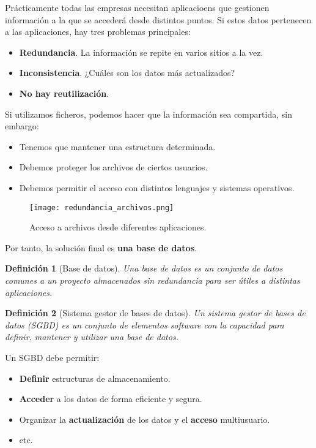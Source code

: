 \documentclass[12pt,spanish]{article}
\newtheorem{definition}{Definición}
\numberwithin{definition}{subsection}
\begin{document}
Prácticamente todas las empresas necesitan aplicacioens que gestionen información a la que se accederá desde distintos puntos. Si estos datos pertenecen a las aplicaciones, hay tres problemas principales:
\begin{itemize}
	\item \textbf{Redundancia}. La información se repite en varios sitios a la vez.
	\item \textbf{Inconsistencia}. ¿Cuáles son los datos más actualizados?
	\item \textbf{No hay reutilización}. 
\end{itemize}

Si utilizamos ficheros, podemos hacer que la información sea compartida, sin embargo:
\begin{itemize}
	\item Tenemos que mantener una estructura determinada.
	\item Debemos proteger los archivos de ciertos usuarios.
	\item Debemos permitir el acceso con distintos lenguajes y sistemas operativos.
\end{itemize}

\begin{figure}[H]
\centering
\texttt{[image: redundancia\_archivos.png]}
\caption{Acceso a archivos desde diferentes aplicaciones.}
\end{figure}

Por tanto, la solución final es \textbf{una base de datos}.

\begin{definition}[Base de datos]
Una \emph{base de datos} es un conjunto de datos comunes a un \textit{proyecto} almacenados sin redundancia para ser útiles a distintas aplicaciones.
\end{definition}

\begin{definition}[Sistema gestor de bases de datos]
Un \emph{sistema gestor de bases de datos (SGBD)} es un conjunto de elementos software con la capacidad para definir, mantener y utilizar una base de datos.
\end{definition}

Un SGBD debe permitir:
\begin{itemize}
\item \textbf{Definir} estructuras de almacenamiento.
\item \textbf{Acceder} a los datos de forma eficiente y segura.
\item Organizar la \textbf{actualización} de los datos y el \textbf{acceso} multiusuario.
\item etc.
\end{itemize}
\end{document}
